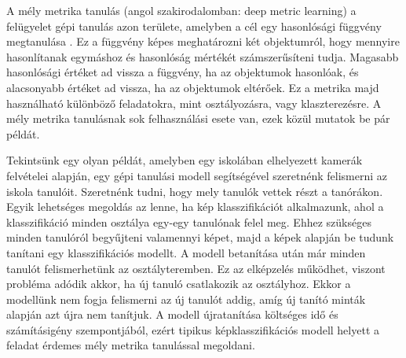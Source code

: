 
A mély metrika tanulás (angol szakirodalomban: deep metric learning) a felügyelet gépi tanulás azon területe, amelyben a cél egy hasonlósági függvény megtanulása \cite{kaya2019dmlsurvey}. Ez a függvény képes meghatározni két objektumról, hogy mennyire hasonlítanak egymáshoz és hasonlóság mértékét számszerűsíteni tudja. Magasabb hasonlósági értéket ad vissza a függvény, ha az objektumok hasonlóak, és alacsonyabb értéket ad vissza, ha az objektumok eltérőek. Ez a metrika majd használható különböző feladatokra, mint osztályozásra, vagy klaszterezésre. A mély metrika tanulásnak sok felhasználási esete van, ezek közül mutatok be pár példát.


Tekintsünk egy olyan példát, amelyben egy iskolában elhelyezett kamerák felvételei alapján, egy gépi tanulási modell segítségével szeretnénk felismerni az iskola tanulóit. Szeretnénk tudni, hogy mely tanulók vettek részt a tanórákon. Egyik lehetséges megoldás az lenne, ha kép klasszifikációt alkalmazunk, ahol a klasszifikáció minden osztálya egy-egy tanulónak felel meg. Ehhez szükséges minden tanulóról begyűjteni valamennyi képet, majd a képek alapján be tudunk tanítani egy klasszifikációs modellt. A modell betanítása után már minden tanulót felismerhetünk az osztályteremben. Ez az elképzelés működhet, viszont probléma adódik akkor, ha új tanuló csatlakozik az osztályhoz. Ekkor a modellünk nem fogja felismerni az új tanulót addig, amíg új tanító minták alapján azt újra nem tanítjuk. A modell újratanítása költséges idő és számításigény szempontjából, ezért tipikus képklasszifikációs modell helyett a feladat érdemes mély metrika tanulással megoldani.


